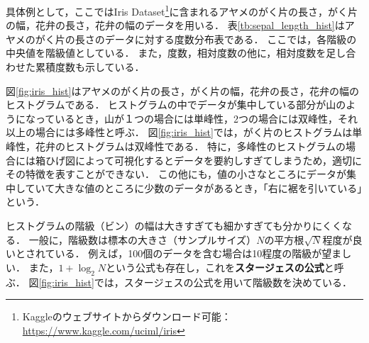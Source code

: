 %
%
具体例として，ここではIris Dataset\footnote{Kaggleのウェブサイトからダウンロード可能：\url{https://www.kaggle.com/uciml/iris}}に含まれるアヤメのがく片の長さ，がく片の幅，花弁の長さ，花弁の幅のデータを用いる．
%
表\ref{tb:sepal_length_hist}はアヤメのがく片の長さのデータに対する度数分布表である．
%
ここでは，各階級の中央値を階級値としている．
%
また，度数，相対度数の他に，相対度数を足し合わせた累積度数も示している．
%

%
図\ref{fig:iris_hist}はアヤメのがく片の長さ，がく片の幅，花弁の長さ，花弁の幅のヒストグラムである．
%
ヒストグラムの中でデータが集中している部分が山のようになっているとき，山が１つの場合には単峰性，2つの場合には双峰性，それ以上の場合には多峰性と呼ぶ．
%
図\ref{fig:iris_hist}では，がく片のヒストグラムは単峰性，花弁のヒストグラムは双峰性である．
%
特に，多峰性のヒストグラムの場合には箱ひげ図によって可視化するとデータを要約しすぎてしまうため，適切にその特徴を表すことができない．
%
この他にも，値の小さなところにデータが集中していて大きな値のところに少数のデータがあるとき，「右に裾を引いている」という．
%

%
ヒストグラムの階級（ビン）の幅は大きすぎても細かすぎても分かりにくくなる．
%
一般に，階級数は標本の大きさ（サンプルサイズ）$ N $の平方根$ \sqrt{N} $程度が良いとされている．
%
例えば，100個のデータを含む場合は10程度の階級が望ましい．
%
また，$ 1 + \log_{2} N $という公式も存在し，これを\textbf{スタージェスの公式}と呼ぶ．
%
図\ref{fig:iris_hist}では，スタージェスの公式を用いて階級数を決めている．
%

%
\begin{table}[H]
    \centering
    \caption{アヤメのがく片の長さの度数分布表}
    \label{tb:sepal_length_hist}
\end{table}
%

